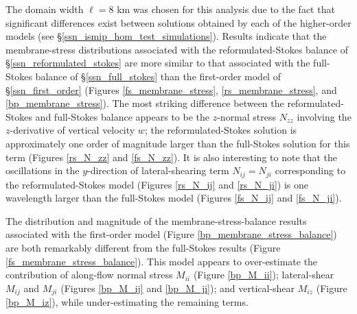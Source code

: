 The domain width $\ell = 8$ km was chosen for this analysis due to the fact that significant differences exist between solutions obtained by each of the higher-order models (see \S \ref{ssn_ismip_hom_test_simulations}).  Results indicate that the membrane-stress distributions associated with the reformulated-Stokes balance of \S \ref{ssn_reformulated_stokes} are more similar to that associated with the full-Stokes balance of \S \ref{ssn_full_stokes} than the first-order model of \S \ref{ssn_first_order} (Figures \ref{fs_membrane_stress}, \ref{rs_membrane_stress}, and \ref{bp_membrane_stress}).  The most striking difference between the reformulated-Stokes and full-Stokes balance appears to be the $z$-normal stress $N_{zz}$ involving the $z$-derivative of vertical velocity $w$; the reformulated-Stokes solution is approximately one order of magnitude larger than the full-Stokes solution for this term (Figures \ref{rs_N_zz} and \ref{fs_N_zz}).  It is also interesting to note that the oscillations in the $y$-direction of lateral-shearing term $N_{ij} = N_{ji}$ corresponding to the reformulated-Stokes model (Figures \ref{rs_N_ij} and \ref{rs_N_ji}) is one wavelength larger than the full-Stokes model (Figures \ref{fs_N_ij} and \ref{fs_N_ji}).

The distribution and magnitude of the membrane-stress-balance results associated with the first-order model (Figure \ref{bp_membrane_stress_balance}) are both remarkably different from the full-Stokes results (Figure \ref{fs_membrane_stress_balance}).  This model appears to over-estimate the contribution of along-flow normal stress $M_{ii}$ (Figure \ref{bp_M_ii}); lateral-shear $M_{ij}$ and $M_{ji}$ (Figures \ref{bp_M_ij} and \ref{bp_M_ji}); and vertical-shear $M_{iz}$ (Figure \ref{bp_M_iz}), while under-estimating the remaining terms.


